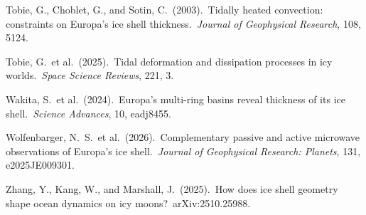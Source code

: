 \documentclass[11pt,letterpaper]{article}
\begin{document}
\begin{enumerate}[label={[\arabic*]},nosep,leftmargin=*]
\item Tobie, G., Choblet, G., and Sotin, C.\ (2003).\ Tidally heated convection: constraints on Europa's ice shell thickness.\ \textit{Journal of Geophysical Research}, 108, 5124.

\item Tobie, G.\ et al.\ (2025).\ Tidal deformation and dissipation processes in icy worlds.\ \textit{Space Science Reviews}, 221, 3.

\item Wakita, S.\ et al.\ (2024).\ Europa's multi-ring basins reveal thickness of its ice shell.\ \textit{Science Advances}, 10, eadj8455.

\item Wolfenbarger, N.\ S.\ et al.\ (2026).\ Complementary passive and active microwave observations of Europa's ice shell.\ \textit{Journal of Geophysical Research: Planets}, 131, e2025JE009301.

\item Zhang, Y., Kang, W., and Marshall, J.\ (2025).\ How does ice shell geometry shape ocean dynamics on icy moons?\ arXiv:2510.25988.

\end{enumerate}
\end{document}
